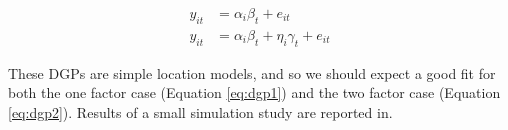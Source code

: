 \documentclass[12pt]{article}
\begin{document}
\begin{align}
    y_{it} &= \alpha_i\beta_t + e_{it} \label{eq:dgp1} \\ 
    y_{it} &= \alpha_i\beta_t + \eta_i\gamma_t + e_{it} \label{eq:dgp2}
\end{align}

\noindent These DGPs are simple location models, and so we should expect a good fit for both the one factor case (Equation \ref{eq:dgp1}) and the two factor case (Equation \ref{eq:dgp2}). Results of a small simulation study are reported in. 


\pagebreak \newpage
\singlespacing

%

\end{document}

